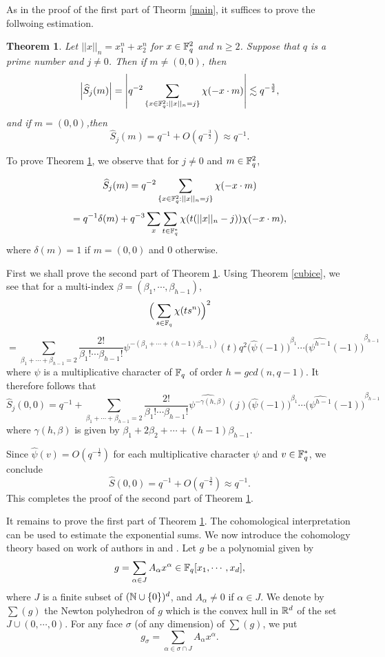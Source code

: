 \documentclass[11pt]{article}
\numberwithin{equation}{section}
\theoremstyle{plain}
\newtheorem{theorem}{Theorem}[section]
\theoremstyle{definition}
\theoremstyle{remark}
\begin{document}
As in the proof of the first part of Theorm \ref{main}, it suffices to prove the follwoing estimation.

\begin{theorem} \label{2D} Let $||x||_n=x_1^n+ x_2^n $
for $x \in \Bbb{F}_q^2$ and $n\ge2$.
Suppose that $q$ is a prime number and $j \not =0$. Then if
$m \not=(0,0) $, then
$$ \left| \widehat{S}_j(m) \right| =\left| q^{-2} \sum_{\{x \in {\Bbb F}_q^2: ||x||_n=j\}} \chi(-x \cdot  
m) \right| \lesssim q^{-\frac{3}{2}}, $$
and if $m =(0, 0)$,then
$$ \widehat{S}_j (m) = q^{-1} + O(q^{-\frac{3}{2}}) \approx  q^{-1} .$$
\end{theorem}

To prove Theorem \ref{2D}, we observe that for $j\ne 0$ and $m \in \Bbb{F}_q^2$,

$$ \widehat{S}_j(m)=q^{-2} \sum_{\{x \in {\Bbb F}_q^2: ||x||_n=j\}} \chi(-x \cdot m)$$
$$=q^{-1}\delta(m)+q^{-3} \sum_x \sum_{t \in {\Bbb F}_q^ 
{*}} \chi(t(||x||_n-j)) \chi(-x \cdot m), $$ where $\delta(m)=1$ if $m= 
(0,  0)$ and $0$ otherwise.

First we shall prove the second part of Theorem \ref{2D}.
Using Theorem \ref{cubice}, we see that for a multi-index
$\beta =(\beta_1,\cdots,\beta_{h-1})$,
$$\Big(\sum_{s\in\Bbb{F}_q}\chi(ts^n)\Big)^2$$
$$=\sum_{\beta_1+\cdots+\beta_{h-1}=2} \frac{2!}{\beta_1!\cdots \beta_{h-1}!}
\psi^{-(\beta_1+\cdots+(h-1)\beta_{h-1})}(t)q^2 {\Big(\widehat{\psi}(-1)\Big)}^{\beta_1}
\cdots {\Big(\widehat{\psi^{h-1}}(-1)\Big)}^{\beta_{h-1}} $$
where $\psi$ is a multiplicative character of $\Bbb{F}_q$ of order
$h= gcd(n, q-1)$.
It therefore follows that
$$\widehat{S}_j(0,0)
=q^{-1}+\sum_{\beta_1+\cdots+\beta_{h-1}=2}\frac{2!}{\beta_1!\cdots \beta_{h-1}!}
\widehat{\psi^{-\gamma(h,\beta)}}(j)
{\Big(\widehat{\psi}(-1)\Big)}^{\beta_1}\cdots
{\Big(\widehat{\psi^{h-1}}(-1)\Big)}^{\beta_{h-1}}$$
where $\gamma(h,\beta)$ is given by $\beta_1+2\beta_2+\cdots+(h-1)\beta_{h-1}.$

Since $\widehat{\psi}(v)= O(q^{-\frac{1}{2}})$
for each multiplicative character $\psi$ and $v\in \Bbb{F}_q^*$,
we conclude 
$$\widehat{S}(0,0) = q^{-1}+O(q^{-\frac{3}{2}})\approx q^{-1}.$$
This completes the proof of the second part of Theorem \ref{2D}.


It remains to prove the first part of Theorem \ref{2D}.
The cohomological interpretation can be used to estimate the exponential sums.
We now introduce the cohomology theory based on work of authors
in \cite{JF} and \cite{AS89}.
Let $g$ be a polynomial given by
\begin{equation}\label{Polynomial} g = \sum_{\alpha\in J}A_{\alpha} x^{\alpha}
\in \Bbb{F}_q [x_1,\cdots,x_d] ,\end{equation}
where $J$ is a finite subset of $(\Bbb{N} \cup \{0\})^d$,
and $A_{\alpha}\ne 0$ if $ \alpha \in J.$
We denote by $\sum(g)$ the Newton polyhedron of $g$ which is the convex hull
in $\Bbb{R}^d$ of the set $J\cup (0,\cdots,0)$.
For any face $\sigma$ (of any dimension) of $\sum(g)$, we put
$$ g_{\sigma} = \sum_{\alpha \in \sigma \cap J} A_{\alpha}x^{\alpha}.$$
\end{document}
